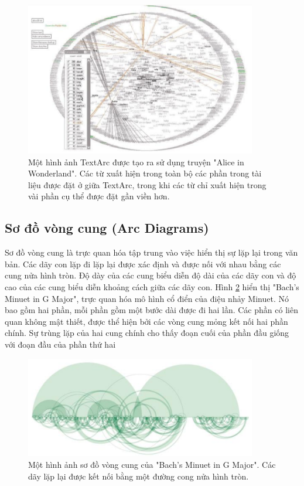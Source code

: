 \documentclass[14pt, a4paper]{article}
\numberwithin{equation}{section}
\numberwithin{figure}{section}
\numberwithin{dl}{section}
\numberwithin{md}{section}
\numberwithin{bd}{section}
\numberwithin{dn}{section}
\numberwithin{hq}{section}
\begin{document}
    \begin{figure}[h!]
        \centering
        \includegraphics[width=0.9\textwidth]{7.png}
        \caption{Một hình ảnh TextArc được tạo ra sử dụng truyện "Alice in Wonderland".
        Các từ xuất hiện trong toàn bộ các phần trong tài liệu được đặt ở giữa TextArc, trong khi các từ chỉ xuất hiện trong vài phần cụ thể được đặt gần viền hơn.}
        \label{fig:7}
    \end{figure}

    \subsection{Sơ đồ vòng cung (Arc Diagrams)}

    Sơ đồ vòng cung là trực quan hóa tập trung vào việc hiển thị sự lặp lại trong văn bản.
    Các dãy con lặp đi lặp lại được xác định và được nối với nhau bằng các cung nửa hình tròn.
    Độ dày của các cung biểu diễn độ dài của các dãy con và độ cao của các cung biểu diễn khoảng cách giữa các dãy con.
    Hình \ref{fig:8} hiển thị "Bach’s Minuet in G Major", trực quan hóa mô hình cổ điển của điệu nhảy Minuet.
    Nó bao gồm hai phần, mỗi phần gồm một bước dài được đi hai lần.
    Các phần có liên quan không mật thiết, được thể hiện bởi các vòng cung mỏng kết nối hai phần chính.
    Sự trùng lặp của hai cung chính cho thấy đoạn cuối của phần đầu giống với đoạn đầu của phần thứ hai

    \begin{figure}[h!]
        \centering
        \includegraphics[width=0.9\textwidth]{8.png}
        \caption{Một hình ảnh sơ đồ vòng cung của "Bach’s Minuet in G Major".
        Các dãy lặp lại được kết nối bằng một đường cong nửa hình tròn. \cite{451}}
        \label{fig:8}
    \end{figure}
\end{document}
